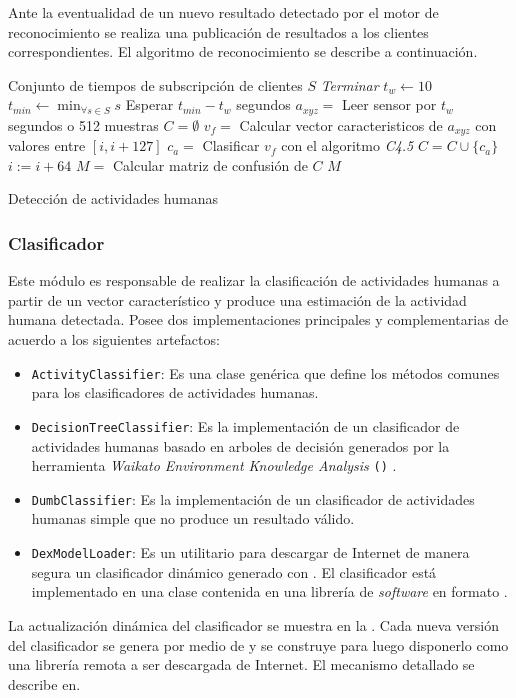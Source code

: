 Ante la eventualidad de un nuevo resultado detectado por el motor
de reconocimiento se realiza una publicación de resultados a los clientes
correspondientes. El algoritmo de reconocimiento se describe a continuación.

\begin{algorithm}[h]
\begin{algorithmic}[1]
    \Require Conjunto de tiempos de subscripción de clientes $S$
 			\State\textit{Terminar}
		\EndIf
		\State $t_w \leftarrow 10$
		\State $t_{min} \leftarrow \min_{\forall s \in S} s$
		\State Esperar $t_{min} - t_w$ segundos 
		\State $ a_{xyz} = $ Leer sensor por $t_w$ segundos o 512 muestras
		\State $ C = \emptyset$
			\State $ v_f = $ Calcular vector caracteristicos de $a_{xyz}$ con valores entre $[i, i + 127]$
			\State $ c_a = $ Clasificar $v_f$ con el algoritmo \textit{C4.5}
			\State $ C = C \cup \{c_a\}$ 
			\State $i := i + 64$
        \EndFor
        \State $ M = $ Calcular matriz de confusión de $C$ 
		\State
		\Return $ M $
	\EndProcedure
\end{algorithmic}

\caption{\label{alg5:reconocimiento}Detección de actividades humanas}
\end{algorithm}


\subsubsection{Clasificador}

Este módulo es responsable de realizar la clasificación de actividades
humanas a partir de un vector característico y produce una estimación
de la actividad humana detectada. Posee dos implementaciones principales
y complementarias de acuerdo a los siguientes artefactos:
\begin{itemize}
\item \texttt{\small{}ActivityClassifier}: Es una clase genérica que define
los métodos comunes para los clasificadores de actividades humanas.
\item \texttt{\small{}DecisionTreeClassifier}: Es la implementación de un
clasificador de actividades humanas basado en arboles de decisión
generados por la herramienta \emph{Waikato Environment Knowledge Analysis}
\texttt{()} \cite{Frank2016}.
\item \texttt{\small{}DumbClassifier}: Es la implementación de un clasificador
de actividades humanas simple que no produce un resultado válido.
\item \texttt{\small{}DexModelLoader}: Es un utilitario para descargar de
Internet de manera segura un clasificador dinámico generado con .
El clasificador está implementado en una clase contenida en una librería
de \emph{software} en formato .
\end{itemize}
La actualización dinámica del clasificador se muestra en la .
Cada nueva versión del clasificador se genera por medio de 
y se construye para luego disponerlo como una librería remota a ser
descargada de Internet. El mecanismo detallado se describe en\cite{Falsina2014}.

